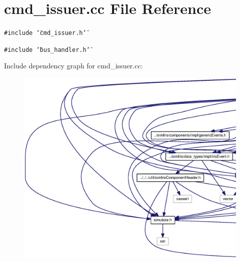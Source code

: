 \section{cmd\_\-issuer.cc File Reference}
\label{cmd__issuer_8cc}
{\tt \#include \char`\"{}cmd\_\-issuer.h\char`\"{}}\par
{\tt \#include \char`\"{}bus\_\-handler.h\char`\"{}}\par


Include dependency graph for cmd\_\-issuer.cc:\nopagebreak
\begin{figure}[H]
\begin{center}
\leavevmode
\includegraphics[width=420pt]{cmd__issuer_8cc__incl}
\end{center}
\end{figure}
